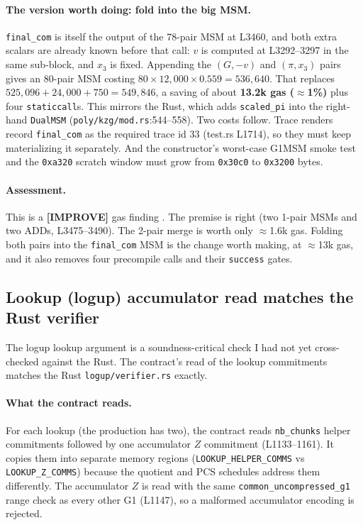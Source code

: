 \paragraph{The version worth doing: fold into the big MSM.}
\texttt{final\_com} is itself the output of the 78-pair MSM at
L3460, and both extra scalars are already known before that call:
$v$ is computed at L3292--3297 in the same sub-block, and $x_3$ is
fixed. Appending the $(G,-v)$ and $(\pi,x_3)$ pairs gives an
80-pair MSM costing $80\times12{,}000\times0.559=536{,}640$. That
replaces $525{,}096+24{,}000+750=549{,}846$, a saving of about
\textbf{13.2k gas ($\approx$1\%)} plus four \texttt{staticcall}s.
This mirrors the Rust, which adds \texttt{scaled\_pi} into the
right-hand \texttt{DualMSM} (\texttt{poly/kzg/mod.rs}:544--558).
Two costs follow. Trace renders record \texttt{final\_com} as the
required trace id 33 (test.rs L1714), so they must keep
materializing it separately. And the constructor's worst-case
G1MSM smoke test and the \texttt{0xa320} scratch window must grow
from \texttt{0x30c0} to \texttt{0x3200} bytes.

\paragraph{Assessment.} This is a
\textcolor{codegenblue}{\textbf{[IMPROVE]}} gas finding
. The premise is right (two 1-pair MSMs and two ADDs,
L3475--3490). The 2-pair merge is worth only $\approx$1.6k gas.
Folding both pairs into the \texttt{final\_com} MSM is the
change worth making, at $\approx$13k gas, and it also removes
four precompile calls and their \texttt{success} gates.

\subsection{Lookup (logup) accumulator read matches the Rust verifier}
\label{sec:pr-lookup-acc}

The logup lookup argument is a soundness-critical check I had not
yet cross-checked against the Rust. The contract's read of the
lookup commitments matches the Rust \texttt{logup/verifier.rs}
exactly.

\paragraph{What the contract reads.}
For each lookup (the production has two), the contract reads
\texttt{nb\_chunks} helper commitments followed by one
accumulator $Z$ commitment (L1133--1161). It copies them into
separate memory regions (\texttt{LOOKUP\_\allowbreak{}HELPER\_\allowbreak{}COMMS} vs
\texttt{LOOKUP\_Z\_COMMS}) because the quotient and PCS schedules
address them differently. The accumulator $Z$ is read with the
same \texttt{common\_\allowbreak{}uncompressed\_\allowbreak{}g1} range check as every other
G1 (L1147), so a malformed accumulator encoding is rejected.

